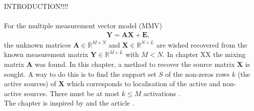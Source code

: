 INTRODUCTION!!!!
\\ \\
For the multiple measurement vector model (MMV)
\begin{align*}
\mathbf{Y} = \mathbf{AX} + \mathbf{E},
\end{align*}
the unknown matrices $\mathbf{A} \in \mathbb{R}^{M \times N}$ and $\mathbf{X} \in \mathbb{R}^{N \times L}$ are wished recovered from the known measurement matrix $\mathbf{Y} \in \mathbb{R}^{M \times L}$ with $M < N$. In chapter XX the mixing matrix $\mathbf{A}$ was found. In this chapter, a method to recover the source matrix $\mathbf{X}$ is sought. A way to do this is to find the support set $S$ of the non-zeros rows $k$ (the active sources) of $\mathbf{X}$ which corresponds to localisation of the active and non-active sources. There must be at most $k \leq M$ activations \cite{??}.
\\
The chapter is inspired by \cite{??} and the article \cite{??} .



